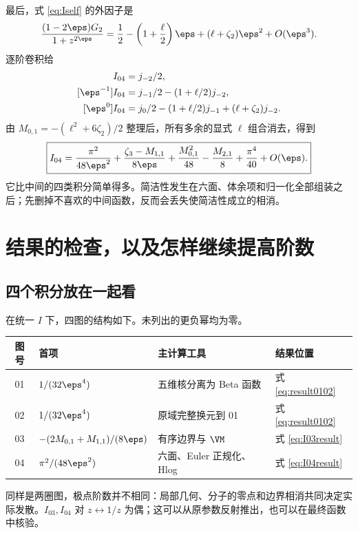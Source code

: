 最后，式 \eqref{eq:Iself} 的外因子是
\begin{equation}
\frac{(1-2\eps)G_2}{1+z^{2\eps}}
=\frac12-\left(1+\frac\ell2\right)\eps
+(\ell+\zeta_2)\eps^2+O(\eps^3).
\end{equation}
逐阶卷积给
\begin{align}
[\eps^{-2}]I_{04}&=j_{-2}/2,\nonumber\\
[\eps^{-1}]I_{04}&=j_{-1}/2-(1+\ell/2)j_{-2},\nonumber\\
[\eps^0]I_{04}&=j_0/2-(1+\ell/2)j_{-1}+(\ell+\zeta_2)j_{-2}.
\end{align}
由 $M_{0,1}=-(\ell^2+6\zeta_2)/2$ 整理后，所有多余的显式 $\ell$ 组合消去，得到
\begin{equation}
\boxed{I_{04}=\frac{\pi^2}{48\eps^2}
+\frac{\zeta_3-M_{1,1}}{8\eps}
+\frac{M_{0,1}^2}{48}-\frac{M_{2,1}}8+\frac{\pi^4}{40}
+O(\eps).}
\label{eq:I04result}
\end{equation}
它比中间的四类积分简单得多。简洁性发生在六面、体余项和归一化全部组装之后；先删掉不喜欢的中间函数，反而会丢失使简洁性成立的相消。

\chapter{结果的检查，以及怎样继续提高阶数}
\section{四个积分放在一起看}
在统一 $I$ 下，四图的结构如下。未列出的更负幂均为零。
\begin{center}
\begin{tabular}{clll}
\toprule
图号 & 首项 & 主计算工具 & 结果位置\\
\midrule
01 & $1/(32\eps^4)$ & 五维核分离为 Beta 函数 & 式 \eqref{eq:result0102}\\
02 & $1/(32\eps^4)$ & 原域完整换元到 01 & 式 \eqref{eq:result0102}\\
03 & $-(2M_{0,1}+M_{1,1})/(8\eps)$ & 有序边界与 $\VM$ & 式 \eqref{eq:I03result}\\
04 & $\pi^2/(48\eps^2)$ & 六面、Euler 正规化、Hlog & 式 \eqref{eq:I04result}\\
\bottomrule
\end{tabular}
\end{center}
同样是两圈图，极点阶数并不相同：局部几何、分子的零点和边界相消共同决定实际发散。$I_{03},I_{04}$ 对 $z\leftrightarrow1/z$ 为偶；这可以从原参数反射推出，也可以在最终函数中核验。

